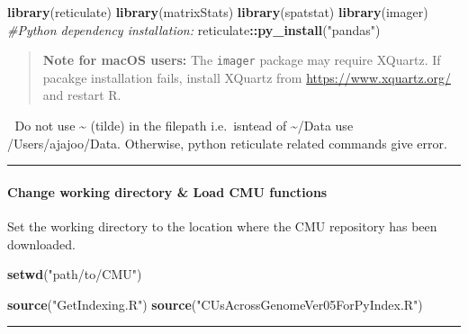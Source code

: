 \documentclass[
]{article}
\newenvironment{Shaded}{\begin{snugshade}}{\end{snugshade}}
\newcommand{\CommentTok}[1]{\textcolor[rgb]{0.56,0.35,0.01}{\textit{#1}}}
\newcommand{\FunctionTok}[1]{\textcolor[rgb]{0.13,0.29,0.53}{\textbf{#1}}}
\newcommand{\NormalTok}[1]{#1}
\newcommand{\SpecialCharTok}[1]{\textcolor[rgb]{0.81,0.36,0.00}{\textbf{#1}}}
\newcommand{\StringTok}[1]{\textcolor[rgb]{0.31,0.60,0.02}{#1}}
\begin{document}
\begin{Shaded}
\begin{Highlighting}[]
\FunctionTok{library}\NormalTok{(reticulate)}
\FunctionTok{library}\NormalTok{(matrixStats)}
\FunctionTok{library}\NormalTok{(spatstat)}
\FunctionTok{library}\NormalTok{(imager)}
\CommentTok{\#Python dependency installation:}
\NormalTok{reticulate}\SpecialCharTok{::}\FunctionTok{py\_install}\NormalTok{(}\StringTok{"pandas"}\NormalTok{)}
\end{Highlighting}
\end{Shaded}

\begin{quote}
\textbf{Note for macOS users:} The \texttt{imager} package may require
XQuartz. If pacakge installation fails, install XQuartz from
\url{https://www.xquartz.org/} and restart R.
\end{quote}

🛑 Do not use \textasciitilde{} (tilde) in the filepath i.e.~isntead of
\textasciitilde/Data use /Users/ajajoo/Data. Otherwise, python
reticulate related commands give error.

\begin{center}\rule{0.5\linewidth}{0.5pt}\end{center}

\paragraph{Change working directory \& Load CMU
functions}\label{change-working-directory-load-cmu-functions}

Set the working directory to the location where the CMU repository has
been downloaded.

\begin{Shaded}
\begin{Highlighting}[]
\FunctionTok{setwd}\NormalTok{(}\StringTok{"path/to/CMU"}\NormalTok{)}
\end{Highlighting}
\end{Shaded}

\begin{Shaded}
\begin{Highlighting}[]
\FunctionTok{source}\NormalTok{(}\StringTok{"GetIndexing.R"}\NormalTok{)}
\FunctionTok{source}\NormalTok{(}\StringTok{"CUsAcrossGenomeVer05ForPyIndex.R"}\NormalTok{)}
\end{Highlighting}
\end{Shaded}

\begin{center}\rule{0.5\linewidth}{0.5pt}\end{center}
\end{document}
